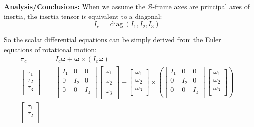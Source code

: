 \documentclass[titlepage]{article}
\newcommand{\diag}{\operatorname{diag}}
\begin{document}
\textbf{Analysis/Conclusions:}
When we assume the $\mathcal{B}$-frame axes are principal axes of inertia, the inertia tensor is equivalent to a diagonal:
\begin{equation}
	I_c = \diag(I_1, I_2, I_3)
\end{equation}

So the scalar differential equations can be simply derived from the Euler equations of rotational motion:
\begin{equation}
	\begin{split}
		\boldsymbol{\tau}_c&=I_c\dot{\boldsymbol{\omega}}+\boldsymbol{\omega}\times\left(I_c\boldsymbol{\omega}\right) \\
		\begin{bmatrix}
			\tau_1 \\
			\tau_2 \\
			\tau_3 \\
		\end{bmatrix}
		&=
		\begin{bmatrix}
			I_1 & 0 & 0 \\
			0 & I_2 & 0 \\
			0 & 0 & I_3 \\
		\end{bmatrix}
		\begin{bmatrix}
			\dot{\omega}_1 \\
			\dot{\omega}_2 \\
			\dot{\omega}_3 \\
		\end{bmatrix}+
		\begin{bmatrix}
			\omega_1 \\
			\omega_2 \\
			\omega_3 \\
		\end{bmatrix}\times\left(
		\begin{bmatrix}
			I_1 & 0 & 0 \\
			0 & I_2 & 0 \\
			0 & 0 & I_3 \\
		\end{bmatrix}
		\begin{bmatrix}
			\omega_1 \\
			\omega_2 \\
			\omega_3 \\
		\end{bmatrix}\right) \\
		\begin{bmatrix}
			\tau_1 \\
			\tau_2 \\

\end{bmatrix}
\end{split}
\end{equation}
\end{document}
